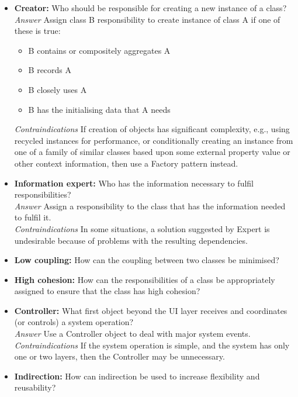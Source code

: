 \begin{itemize}
    \item \textbf{Creator:} Who should be responsible for creating a new instance of a class?\\
    \textit{Answer} Assign class B responsibility to create instance of class A if one of these is true:
    \begin{itemize}
        \item B contains or compositely aggregates A
        \item B records A
        \item B closely uses A
        \item B has the initialising data that A needs
    \end{itemize}
    \textit{Contraindications} If creation of objects has significant complexity, e.g., using recycled instances for performance, or conditionally creating an instance from one of a family of similar classes based upon some external property value or other context information, then use a Factory pattern instead.
    \item \textbf{Information expert:} Who has the information necessary to fulfil responsibilities?\\
    \textit{Answer} Assign a responsibility to the class that has the information needed to fulfil it.\\
    \textit{Contraindications} In some situations, a solution suggested by Expert is undesirable because of problems with the resulting dependencies.
    \item \textbf{Low coupling:} How can the coupling between two classes be minimised?\\
    \item \textbf{High cohesion:} How can the responsibilities of a class be appropriately assigned to ensure that the class has high cohesion?\\
    \item \textbf{Controller:} What first object beyond the UI layer receives and coordinates (or controls) a system operation?\\
    \textit{Answer} Use a Controller object to deal with major system events.\\
    \textit{Contraindications} If the system operation is simple, and the system has only one or two layers, then the Controller may be unnecessary.
    \item \textbf{Indirection:} How can indirection be used to increase flexibility and reusability?\\

\end{itemize}
